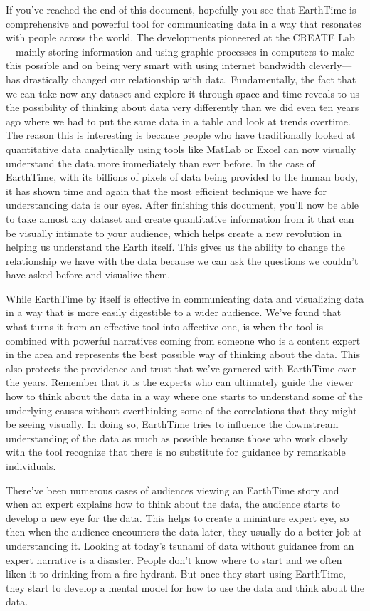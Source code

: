 \documentclass[
]{krantz}
\begin{document}
If you've reached the end of this document, hopefully you see that EarthTime is comprehensive and powerful tool for communicating data in a way that resonates with people across the world. The developments pioneered at the CREATE Lab---mainly storing information and using graphic processes in computers to make this possible and on being very smart with using internet bandwidth cleverly---has drastically changed our relationship with data. Fundamentally, the fact that we can take now any dataset and explore it through space and time reveals to us the possibility of thinking about data very differently than we did even ten years ago where we had to put the same data in a table and look at trends overtime. The reason this is interesting is because people who have traditionally looked at quantitative data analytically using tools like MatLab or Excel can now visually understand the data more immediately than ever before. In the case of EarthTime, with its billions of pixels of data being provided to the human body, it has shown time and again that the most efficient technique we have for understanding data is our eyes. After finishing this document, you'll now be able to take almost any dataset and create quantitative information from it that can be visually intimate to your audience, which helps create a new revolution in helping us understand the Earth itself. This gives us the ability to change the relationship we have with the data because we can ask the questions we couldn't have asked before and visualize them.

While EarthTime by itself is effective in communicating data and visualizing data in a way that is more easily digestible to a wider audience. We've found that what turns it from an effective tool into affective one, is when the tool is combined with powerful narratives coming from someone who is a content expert in the area and represents the best possible way of thinking about the data. This also protects the providence and trust that we've garnered with EarthTime over the years. Remember that it is the experts who can ultimately guide the viewer how to think about the data in a way where one starts to understand some of the underlying causes without overthinking some of the correlations that they might be seeing visually. In doing so, EarthTime tries to influence the downstream understanding of the data as much as possible because those who work closely with the tool recognize that there is no substitute for guidance by remarkable individuals.

There've been numerous cases of audiences viewing an EarthTime story and when an expert explains how to think about the data, the audience starts to develop a new eye for the data. This helps to create a miniature expert eye, so then when the audience encounters the data later, they usually do a better job at understanding it. Looking at today's tsunami of data without guidance from an expert narrative is a disaster. People don't know where to start and we often liken it to drinking from a fire hydrant. But once they start using EarthTime, they start to develop a mental model for how to use the data and think about the data.
\end{document}
